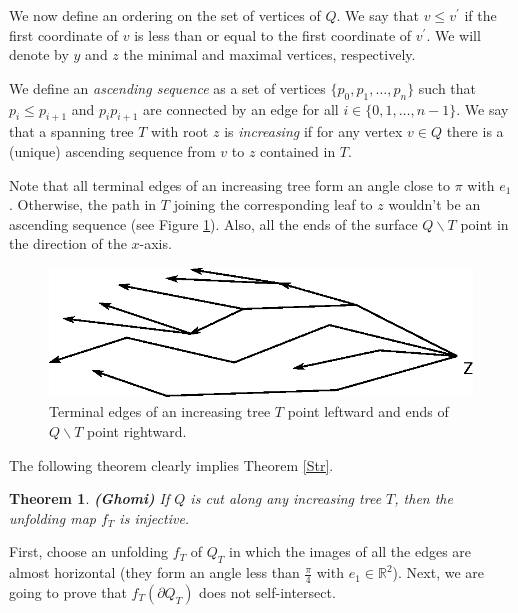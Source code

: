 \documentclass{article}
\theoremstyle{theorem}
\newtheorem{teorema}{Theorem}
\newcommand{\field}[1]{\ensuremath{\mathbb{#1}}}
\newcommand{\R}{\field{R}}
\begin{document}
We now define an ordering on the set of vertices of $Q$. We say that $v \leq v^{\prime}$ if the first coordinate of $v$ is less than or equal to the first coordinate of $v^{\prime}$. We will denote by $y$ and $z$ the minimal and maximal vertices, respectively.

We define an \textit{ascending sequence} as a set of vertices $\{ p_0, p_1, \ldots , p_n   \}$ such that $p_i \leq p_{i+1}$ and $p_i p_{i+1}$ are connected by an edge for all $i \in \{ 0,1, \ldots, n-1 \} $. We say that a spanning tree $T$ with root $z$ is \textit{increasing} if for any vertex $v\in Q$ there is a (unique) ascending sequence from $v$ to $z$ contained in $T$. 

Note that all terminal edges of an increasing tree form an angle close to $\pi$ with $e_1$. Otherwise, the path in $T$ joining the corresponding leaf to $z$ wouldn't be an ascending sequence (see Figure \ref{Mon}). Also, all the ends of the surface $Q \backslash T$ point in the direction of the $x$-axis. 





\begin{figure}[h]
\centering
{}
\includegraphics[scale=0.8]{Mono.eps}
\caption{Terminal edges of an increasing tree $T$ point leftward and ends of $Q \backslash T$ point rightward.}\label{Mon}
\end{figure}


The following theorem clearly implies Theorem \ref{Str}.




\begin{teorema}\label{Gho}
{\textbf{(Ghomi)} If $Q$ is cut along any increasing tree $T$, then the unfolding map $f_T$ is injective.}
\end{teorema}






First, choose an unfolding $f_T$ of $Q_T$ in which the images of all the edges are almost horizontal (they form an angle less than $\frac{\pi}{4}$ with $e_1 \in \R ^2$). Next, we are going to prove that $f_T(\partial Q_T)$ does not self-intersect.
\end{document}

